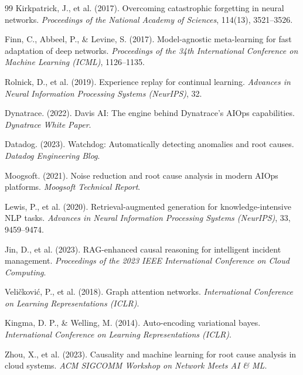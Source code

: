 \begin{thebibliography}{99}
Kirkpatrick, J., et al. (2017). Overcoming catastrophic forgetting in neural networks. \textit{Proceedings of the National Academy of Sciences}, 114(13), 3521--3526.

Finn, C., Abbeel, P., \& Levine, S. (2017). Model-agnostic meta-learning for fast adaptation of deep networks. \textit{Proceedings of the 34th International Conference on Machine Learning (ICML)}, 1126--1135.

Rolnick, D., et al. (2019). Experience replay for continual learning. \textit{Advances in Neural Information Processing Systems (NeurIPS)}, 32.

Dynatrace. (2022). Davis AI: The engine behind Dynatrace's AIOps capabilities. \textit{Dynatrace White Paper}.

Datadog. (2023). Watchdog: Automatically detecting anomalies and root causes. \textit{Datadog Engineering Blog}.

Moogsoft. (2021). Noise reduction and root cause analysis in modern AIOps platforms. \textit{Moogsoft Technical Report}.

Lewis, P., et al. (2020). Retrieval-augmented generation for knowledge-intensive NLP tasks. \textit{Advances in Neural Information Processing Systems (NeurIPS)}, 33, 9459--9474.

Jin, D., et al. (2023). RAG-enhanced causal reasoning for intelligent incident management. \textit{Proceedings of the 2023 IEEE International Conference on Cloud Computing}.

Veli\v{c}kovi\'{c}, P., et al. (2018). Graph attention networks. \textit{International Conference on Learning Representations (ICLR)}.

Kingma, D. P., \& Welling, M. (2014). Auto-encoding variational bayes. \textit{International Conference on Learning Representations (ICLR)}.

Zhou, X., et al. (2023). Causality and machine learning for root cause analysis in cloud systems. \textit{ACM SIGCOMM Workshop on Network Meets AI \& ML}.

\end{thebibliography}
